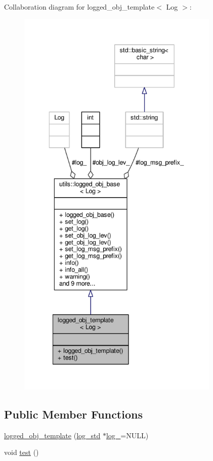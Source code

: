 Collaboration diagram for logged\-\_\-obj\-\_\-template$<$ Log $>$\-:
\nopagebreak
\begin{figure}[H]
\begin{center}
\leavevmode
\includegraphics[height=550pt]{classlogged__obj__template__coll__graph}
\end{center}
\end{figure}
\subsection*{Public Member Functions}
\begin{DoxyCompactItemize}
\item 
\hyperlink{classlogged__obj__template_ac6737589850a625d7d112531f4248d6e}{logged\-\_\-obj\-\_\-template} (\hyperlink{classutils_1_1log__std}{log\-\_\-std} $\ast$\hyperlink{classutils_1_1logged__obj__base_a8dedfdc5d7ab2e5aaed5e24797e51977}{log\-\_\-}=N\-U\-L\-L)
\item 
void \hyperlink{classlogged__obj__template_ab1b1cf9ed29eb291f0c67a4d8b9f1827}{test} ()
\end{DoxyCompactItemize}
